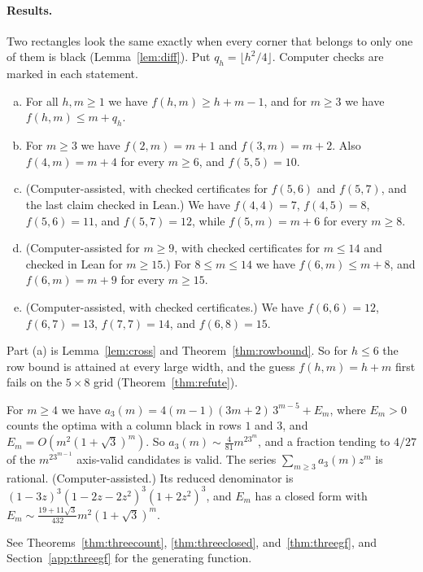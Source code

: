 \paragraph{Results.} Two rectangles look the same exactly when every corner that belongs
to only one of them is black (Lemma~\ref{lem:diff}). Put $q_h=\lfloor h^2/4\rfloor$.
Computer checks are marked in each statement.

\begin{introthm}\label{thm:A}
\begin{enumerate}[(a)]
\item For all $h,m\ge1$ we have $f(h,m)\ge h+m-1$, and for $m\ge3$ we have
$f(h,m)\le m+q_h$.
\item For $m\ge3$ we have $f(2,m)=m+1$ and $f(3,m)=m+2$. Also $f(4,m)=m+4$ for every
$m\ge6$, and $f(5,5)=10$.
\item (Computer-assisted, with checked certificates for $f(5,6)$ and $f(5,7)$, and the last
claim checked in Lean.) We have $f(4,4)=7$, $f(4,5)=8$,
$f(5,6)=11$, and $f(5,7)=12$, while $f(5,m)=m+6$ for every $m\ge8$.
\item (Computer-assisted for $m\ge9$, with checked certificates for $m\le14$ and checked in Lean
for $m\ge15$.) For $8\le m\le14$ we have $f(6,m)\le m+8$, and $f(6,m)=m+9$ for every $m\ge15$.
\item (Computer-assisted, with checked certificates.) We have $f(6,6)=12$,
$f(6,7)=13$, $f(7,7)=14$, and $f(6,8)=15$.
\end{enumerate}
\end{introthm}

Part (a) is Lemma~\ref{lem:cross} and Theorem~\ref{thm:rowbound}. So for $h\le6$ the row
bound is attained at every large width, and the guess $f(h,m)=h+m$ first fails on the
$5\times8$ grid (Theorem~\ref{thm:refute}).

\begin{introthm}\label{thm:B}
For $m\ge4$ we have $a_3(m)=4(m-1)(3m+2)\,3^{m-5}+E_m$, where $E_m>0$ counts the optima
with a column black in rows $1$ and $3$, and $E_m=O(m^2(1+\sqrt3)^m)$. So $a_3(m)\sim\frac4{81}m^23^m$, and a fraction
tending to $4/27$ of the $m^23^{m-1}$ axis-valid candidates is valid. The series
$\sum_{m\ge3}a_3(m)z^m$ is rational. (Computer-assisted.) Its reduced denominator is
$(1-3z)^3(1-2z-2z^2)^3(1+2z^2)^3$, and $E_m$ has a closed form with
$E_m\sim\frac{19+11\sqrt3}{432}m^2(1+\sqrt3)^m$.
\end{introthm}

See Theorems~\ref{thm:threecount}, \ref{thm:threeclosed}, and~\ref{thm:threegf}, and
Section~\ref{app:threegf} for the generating function.


